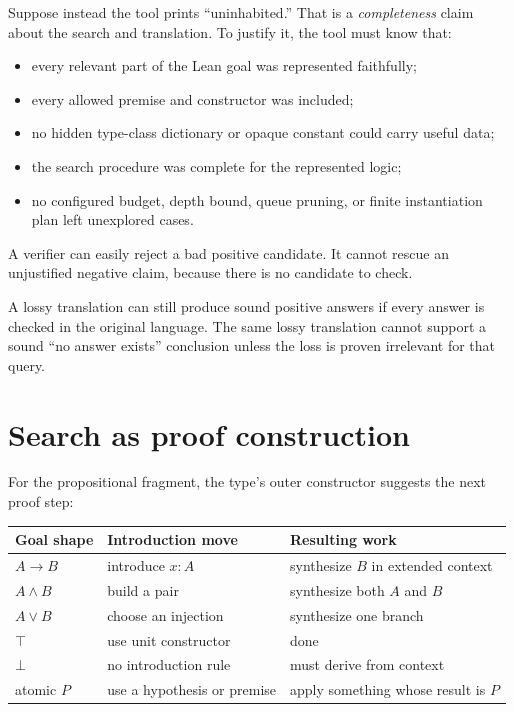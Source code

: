 \documentclass[10pt,letterpaper,oneside,openany]{report}
\begin{document}
Suppose instead the tool prints ``uninhabited.''  That is a \emph{completeness} claim about the search and translation.  To justify it, the tool must know that:

\begin{itemize}
\item every relevant part of the Lean goal was represented faithfully;
\item every allowed premise and constructor was included;
\item no hidden type-class dictionary or opaque constant could carry useful data;
\item the search procedure was complete for the represented logic;
\item no configured budget, depth bound, queue pruning, or finite instantiation plan left unexplored cases.
\end{itemize}

A verifier can easily reject a bad positive candidate.  It cannot rescue an unjustified negative claim, because there is no candidate to check.

\begin{keyidea}
A lossy translation can still produce sound positive answers if every answer is checked in the original language.  The same lossy translation cannot support a sound ``no answer exists'' conclusion unless the loss is proven irrelevant for that query.
\end{keyidea}

\section{Search as proof construction}

For the propositional fragment, the type's outer constructor suggests the next proof step:

\begin{center}
\begin{tabularx}{\textwidth}{@{}l X X@{}}
\toprule
Goal shape & Introduction move & Resulting work \\
\midrule
$A \to B$ & introduce $x:A$ & synthesize $B$ in extended context \\
$A \land B$ & build a pair & synthesize both $A$ and $B$ \\
$A \lor B$ & choose an injection & synthesize one branch \\
$\top$ & use unit constructor & done \\
$\bot$ & no introduction rule & must derive from context \\
atomic $P$ & use a hypothesis or premise & apply something whose result is $P$ \\
\bottomrule
\end{tabularx}
\end{center}
\end{document}
